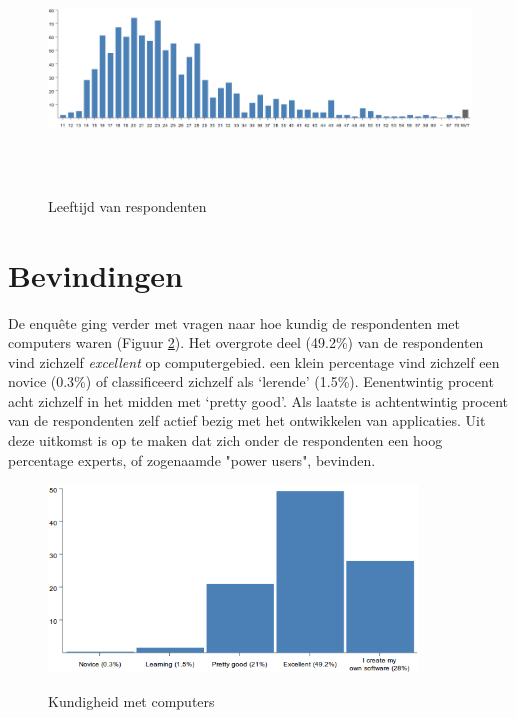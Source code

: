         \begin{figure}
          \begin{center}
          \caption{Leeftijd van respondenten}
            \includegraphics[height=58mm, angle=90]{../images/enquete/age}
          \label{fig:age}

          \end{center}
        \end{figure}

      \section{Bevindingen}
        De enqu\^ete ging verder met vragen naar hoe kundig de respondenten met computers waren (Figuur \ref{fig:skill}). Het overgrote deel (49.2\%) van de respondenten vind zichzelf \emph{excellent} op computergebied. een klein percentage vind zichzelf een novice (0.3\%) of classificeerd zichzelf als `lerende' (1.5\%). Eenentwintig procent acht zichzelf in het midden met `pretty good'. Als laatste is achtentwintig procent van de respondenten zelf actief bezig met het ontwikkelen van applicaties. Uit deze uitkomst is op te maken dat zich onder de respondenten een hoog percentage experts, of zogenaamde "power users", bevinden.
        \begin{figure}
          \begin{center}
          \caption{Kundigheid met computers}
            \includegraphics[height=50mm]{../images/enquete/good-with-computers}
          \label{fig:skill}
          \end{center}
        \end{figure}

